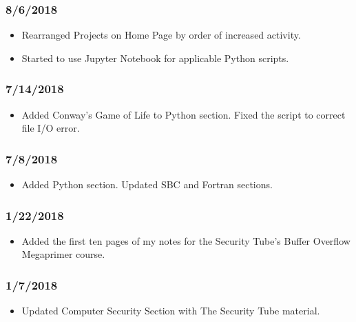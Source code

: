 \subsubsection{8/6/2018}

\begin{itemize}
\item Rearranged Projects on Home Page by order of increased activity.
\item Started to use Jupyter Notebook for applicable Python scripts.
\end{itemize}

\subsubsection{7/14/2018}

\begin{itemize}
\item Added Conway's Game of Life to Python section. Fixed the script to correct file I/O error.
\end{itemize}

\subsubsection{7/8/2018}

\begin{itemize}
\item Added Python section. Updated SBC and Fortran sections.
\end{itemize}

\subsubsection{1/22/2018}

\begin{itemize}
\item Added the first ten pages of my notes for the Security Tube's Buffer Overflow Megaprimer course.
\end{itemize}

\subsubsection{1/7/2018}

\begin{itemize}
\item Updated Computer Security Section with The Security Tube material.
\end{itemize}

